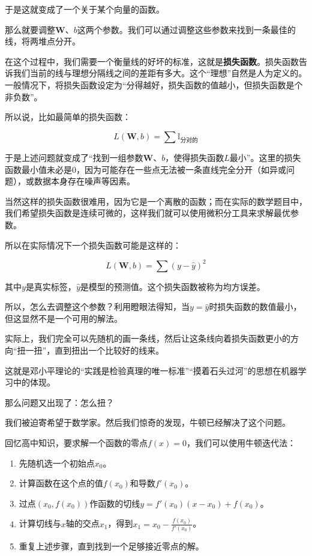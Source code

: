 \documentclass[fontset=none]{ctexart}
\begin{document}
于是这就变成了一个关于某个向量的函数。

那么就要调整$\mathbf{W}$、$b$这两个参数。我们可以通过调整这些参数来找到一条最佳的线，将两堆点分开。

在这个过程中，我们需要一个衡量线的好坏的标准，这就是\textbf{损失函数}。损失函数告诉我们当前的线与理想分隔线之间的差距有多大。这个“理想”自然是人为定义的。一般情况下，将损失函数设定为“分得越好，损失函数的值越小，但损失函数是个非负数”。

所以说，比如最简单的损失函数：

\[L(\mathbf{W}, b) = \sum\mathbb{I}_{\text{分对的}}\]

于是上述问题就变成了“找到一组参数$\mathbf{W}$、$b$，使得损失函数$L$最小”。这里的损失函数最小值未必是0，因为可能存在一些点无法被一条直线完全分开（如异或问题），或数据本身存在噪声等因素。

当然这样的损失函数很难用，因为它是一个离散的函数；而在实际的数学题目中，我们希望损失函数是连续可微的，这样我们就可以使用微积分工具来求解最优参数。

所以在实际情况下一个损失函数可能是这样的：

\[L(\mathbf{W}, b) = \sum (y - \hat{y})^2\]

其中$y$是真实标签，$\hat{y}$是模型的预测值。这个损失函数被称为均方误差。

所以，怎么去调整这个参数？利用瞪眼法得知，当$y = \hat{y}$时损失函数的数值最小，但这显然不是一个可用的解法。

实际上，我们完全可以先随机的画一条线，然后让这条线向着损失函数更小的方向“扭一扭”，直到扭出一个比较好的线来。

这就是邓小平理论的“实践是检验真理的唯一标准”“摸着石头过河”的思想在机器学习中的体现。

那么问题又出现了：怎么扭？

我们被迫寄希望于数学家。然后我们惊奇的发现，牛顿已经解决了这个问题。

回忆高中知识，要求解一个函数的零点$f(x) = 0$，我们可以使用牛顿迭代法：
\begin{enumerate}
    \item 先随机选一个初始点$x_0$。
    \item 计算函数在这个点的值$f(x_0)$和导数$f'(x_0)$。
    \item 过点$(x_0, f(x_0))$作函数的切线$y = f'(x_0)(x - x_0) + f(x_0)$。
    \item 计算切线与$x$轴的交点$x_1$，得到$x_1 = x_0 - \frac{f(x_0)}{f'(x_0)}$。
    \item 重复上述步骤，直到找到一个足够接近零点的解。
\end{enumerate}
\end{document}
